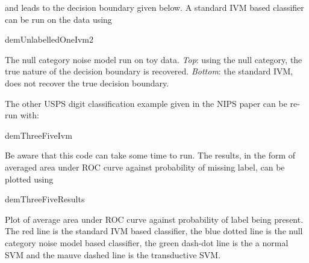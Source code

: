 and leads to the decision boundary given below. A standard IVM based classifier can be run on the data using



\begin{octave}

 demUnlabelledOneIvm2

\end{octave}



\begin{center}

The null category noise model run on toy data. \emph{Top}: using the null category, the true nature of the decision boundary is recovered. \emph{Bottom}: the standard IVM, does not recover the true decision boundary.\end{center}



The other USPS digit classification example given in the NIPS paper can be re-run with:



\begin{octave}

 demThreeFiveIvm

\end{octave}



Be aware that this code can take some time to run. The results, in the form of averaged area under ROC curve against probability of missing label, can be plotted using





\begin{octave}
 demThreeFiveResults
\end{octave}

\begin{center}


Plot of average area under ROC curve against probability of label being present. The red line is the standard IVM based classifier, the blue dotted line is the null category noise model based classifier, the green dash-dot line is the a normal SVM and the mauve dashed line is the transductive SVM.

\end{center}





